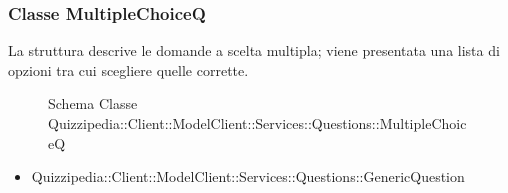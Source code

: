 \subsubsection{Classe MultipleChoiceQ}
La struttura descrive le domande a scelta multipla; viene presentata una lista di opzioni tra cui scegliere quelle corrette.
\begin{figure}[H]
\centering
\noindent{}
\caption{Schema Classe Quizzipedia::Client::ModelClient::Services::Questions::MultipleChoiceQ}
\end{figure}
\begin{itemize}
\item Quizzipedia::Client::ModelClient::Services::Questions::GenericQuestion
\end{itemize}
